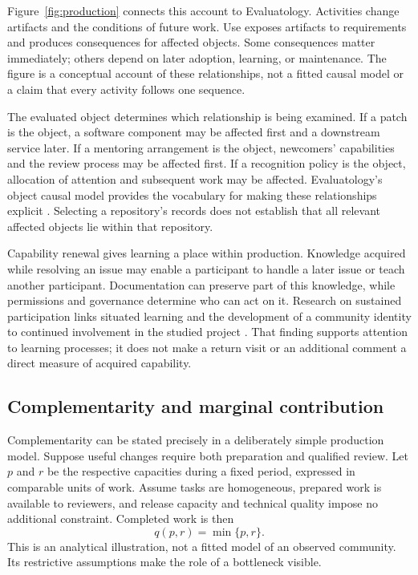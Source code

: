 Figure~\ref{fig:production} connects this account to Evaluatology. Activities change artifacts and the conditions of future work. Use exposes artifacts to requirements and produces consequences for affected objects. Some consequences matter immediately; others depend on later adoption, learning, or maintenance. The figure is a conceptual account of these relationships, not a fitted causal model or a claim that every activity follows one sequence.



The evaluated object determines which relationship is being examined. If a patch is the object, a software component may be affected first and a downstream service later. If a mentoring arrangement is the object, newcomers' capabilities and the review process may be affected first. If a recognition policy is the object, allocation of attention and subsequent work may be affected. Evaluatology's object causal model provides the vocabulary for making these relationships explicit \citep[Chapters 8 and 11]{zhan2026book}. Selecting a repository's records does not establish that all relevant affected objects lie within that repository.

Capability renewal gives learning a place within production. Knowledge acquired while resolving an issue may enable a participant to handle a later issue or teach another participant. Documentation can preserve part of this knowledge, while permissions and governance determine who can act on it. Research on sustained participation links situated learning and the development of a community identity to continued involvement in the studied project \citep{fang2009}. That finding supports attention to learning processes; it does not make a return visit or an additional comment a direct measure of acquired capability.

\subsection{Complementarity and marginal contribution}
Complementarity can be stated precisely in a deliberately simple production model. Suppose useful changes require both preparation and qualified review. Let \(p\) and \(r\) be the respective capacities during a fixed period, expressed in comparable units of work. Assume tasks are homogeneous, prepared work is available to reviewers, and release capacity and technical quality impose no additional constraint. Completed work is then
\begin{equation}
q(p,r)=\min\{p,r\}.
\label{eq:capacity}
\end{equation}
This is an analytical illustration, not a fitted model of an observed community. Its restrictive assumptions make the role of a bottleneck visible.

